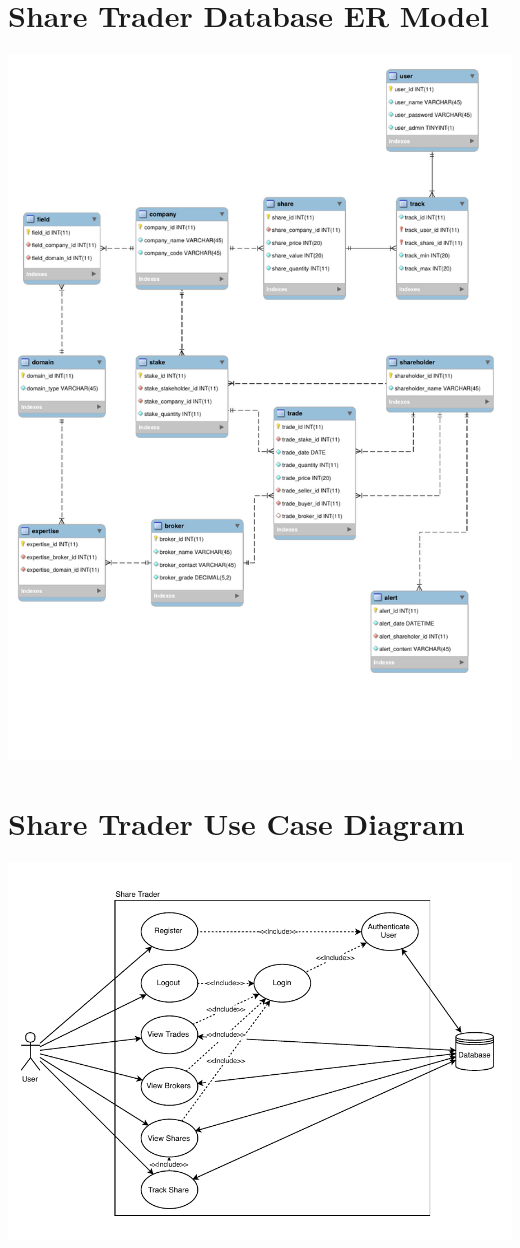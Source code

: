 \documentclass[12pt, a4paper,titlepage]{article}
\begin{document}
\clearpage




\appendix


\section{Share Trader Database ER Model}
\includegraphics[width=\textwidth]{res/share_trader_er.pdf}
\label{ap-schema}


\section{Share Trader Use Case Diagram}
\includegraphics[width=\textwidth]{res/share_trader_uc.pdf}
\label{ap-uc}
\end{document}
